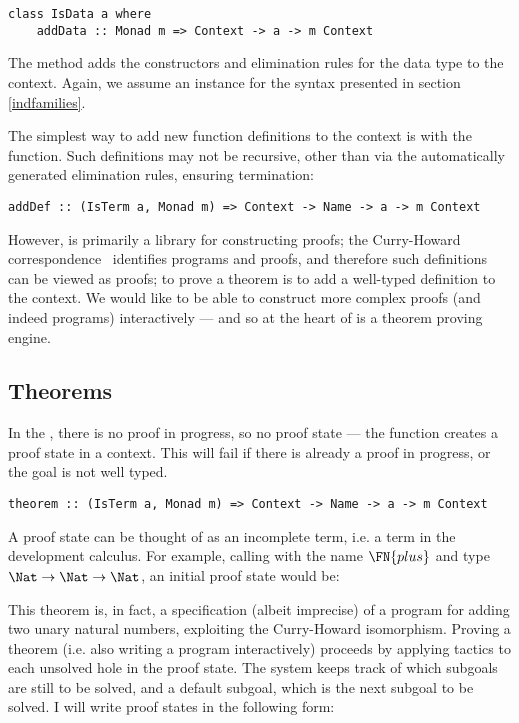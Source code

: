 \begin{verbatim}
class IsData a where
    addData :: Monad m => Context -> a -> m Context
\end{verbatim}

The  method adds the constructors and elimination
rules for the data type to the context. Again, we assume an instance
for the syntax presented in section \ref{indfamilies}.

The simplest way to add new function definitions to the context is
with the  function. Such definitions may not be recursive,
other than via the automatically generated elimination rules, ensuring
termination:

\begin{verbatim}
addDef :: (IsTerm a, Monad m) => Context -> Name -> a -> m Context
\end{verbatim}

However, \Ivor{} is primarily a library for constructing proofs; the
Curry-Howard correspondence~\cite{curry-feys,howard} identifies
programs and proofs, and therefore such definitions can be viewed as
proofs; to prove a theorem is to add a well-typed definition to the
context.  We would like to be able to construct more complex proofs
(and indeed programs) interactively --- and so at the heart of \Ivor{}
is a theorem proving engine.

\subsection{Theorems}

In the , there is no proof in progress, so no
proof state --- the  function creates a proof state in
a context. This will fail if there is already a proof in progress, or
the goal is not well typed.

\begin{verbatim}
theorem :: (IsTerm a, Monad m) => Context -> Name -> a -> m Context
\end{verbatim}

A proof state can be thought of as an incomplete term, i.e. a
term in the development calculus.
For example, calling 
with the name $\FN{plus}$ and type $\Nat\to\Nat\to\Nat$, an initial
proof state would be:


This theorem is, in fact, a specification (albeit imprecise) of a
program for adding two unary natural numbers, exploiting the
Curry-Howard isomorphism.  Proving a theorem (i.e. also writing a
program interactively) proceeds by applying tactics to each unsolved
hole in the proof state. The system keeps track of which subgoals are
still to be solved, and a default subgoal, which is the next subgoal
to be solved. I will write proof states in the following form:

